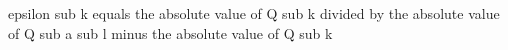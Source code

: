epsilon sub k equals the absolute value of Q sub k divided by the absolute value of Q sub a sub l minus the absolute value of Q sub k